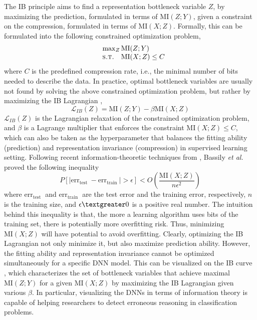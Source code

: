 \documentclass[10pt,journal,compsoc]{IEEEtran}
\begin{document}
The IB principle aims to find a representation bottleneck variable $Z$, by maximizing the prediction, formulated in terms of $\mathrm{MI}(Z; Y)$, given a constraint on the compression, formulated in terms of $\mathrm{MI}(X; Z)$. Formally, this can be formulated into the following constrained optimization problem,
\begin{equation}
\begin{array}{ll}
\label{eq:constrained_IB}
&\max_{Z} \mathrm{MI}(Z; Y) \\
&\textsc{s.t.} \quad \mathrm{MI}(X; Z)\leq C
\end{array}
\end{equation}
where $C$ is the predefined compression rate, i.e., the minimal number of bits needed to describe the data. In practice, optimal bottleneck variables are usually not found by solving the above constrained optimization problem, but rather by maximizing the IB Lagrangian \cite{GiladBachrach2003AnIT, Shamir2010LearningAG},
\begin{equation}
\mathcal{L}_{IB}(Z) = \mathrm{MI}(Z; Y) - \beta \mathrm{MI}(X; Z)
\label{eq:IB_lagrangian}
\end{equation}
$\mathcal{L}_{IB}(Z)$ is the Lagrangian relaxation of the constrained optimization problem, and $\beta$ is a Lagrange multiplier that enforces the constraint $\mathrm{MI}(X; Z) \leq C$, which can also be taken as the hyperparameter that balances the fitting ability (prediction) and representation invariance (compression) in supervised learning setting.
Following recent information-theoretic techniques from \cite{He2016DeepRL}, Bassily \emph{et al.} \cite{Bassily2018LearnersTU} proved the following inequality
\begin{equation}
P\left[\left|\mathrm{err}_{\text {test }}-\mathrm{err}_{\text {train }}\right|>\epsilon\right]<O\left(\frac{\mathrm{MI}(X; Z)}{n \epsilon^{2}}\right)
\end{equation}
where $\mathrm{err}_{\text {test }}$ and $\mathrm{err}_{\text {train }}$ are the test error and the training error, respectively, $n$ is the training size, and $\epsilon \textgreater 0$ is a positive real number.
The intuition behind this inequality is that, the more a learning algorithm uses bits of the training set, there is potentially more overfitting risk. Thus, minimizing $\mathrm{MI}(X; Z)$ will have potential to avoid overfitting. Clearly, optimizing the IB Lagrangian not only minimize it, but also maximize prediction ability.
However, the fitting ability and representation invariance cannot be optimized simultaneously for a specific DNN model. This can be visualized on the IB curve \cite{Tishby2000TheIB,phdthesis}, which characterizes the set of bottleneck variables that achieve maximal $\mathrm{MI}(Z; Y)$ for a given $\mathrm{MI}(X; Z)$ by maximizing the IB Lagrangian given various $\beta$. In particular, visualizing the DNNs in terms of information theory is capable of helping researchers to detect erroneous reasoning in classification problems.
\end{document}

